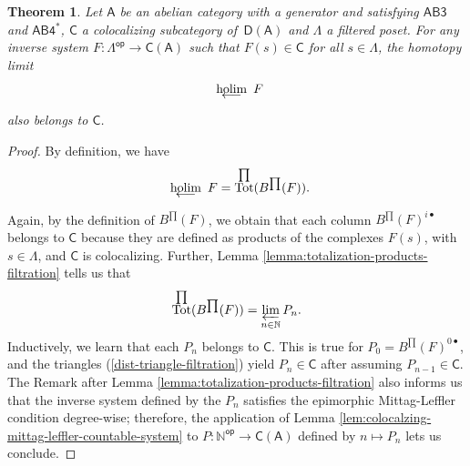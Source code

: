 \documentclass[reqno,11pt]{amsart}
\theoremstyle{plain}
\newtheorem{thm}{Theorem}[section]
\theoremstyle{remark}
\theoremstyle{definition}
\numberwithin{equation}{thm}
\newcommand{\SA}{\mathsf{A}}
\newcommand{\SC}{\mathsf{C}}
\newcommand{\CCC}{\boldsymbol{\mathsf{C}}}
\newcommand{\D}{\boldsymbol{\mathsf{D}}}
\newcommand{\NN}{\mathbb{N}}
\newcommand{\holim}[1]{\begin{array}[t]{c} {\rm holim}\\[-7.5 pt]
		{\longleftarrow} \end{array}}
\DeclareMathOperator{\Tot}{Tot}
\newcommand{\op}{\mathsf{op}}
\begin{document}
	\begin{thm}\label{thm:holim-colocalizing}
		Let $\SA$ be an abelian category with a generator and satisfying $\mathsf{AB3}$ and $\mathsf{AB4^*}$, $\SC$ a colocalizing subcategory of \,$\D(\SA)$ and $\Lambda$ a filtered poset. For any inverse system $F \colon \Lambda^\op \to \CCC(\SA)$ such that $F(s) \in \SC$ for all $s \in \Lambda$, the homotopy limit
		\[
		\holim{} F
		\]
		also belongs to $\SC$.
	\end{thm}
	\begin{proof}
		By definition, we have 
		\[
			\holim{} F = \Tot^{\prod}(B^{\prod}(F)).
		\]
		Again, by the definition of $B^{\prod}(F)$, we obtain that each column $B^{\prod}(F)^{i \bullet}$ belongs to $\SC$ because they are defined as products of the complexes $F(s)$, with $s \in \Lambda$, and $\SC$ is colocalizing. Further, Lemma \ref{lemma:totalization-products-filtration} tells us that 
		\[
			\Tot^{\prod}(B^{\prod}(F)) = \varprojlim_{n \in \NN} P_n.
		\]
		Inductively, we learn that each $P_n$ belongs to $\SC$. This is true for $P_0 = B^{\prod}(F)^{0 \bullet}$, and the triangles (\ref{dist-triangle-filtration}) yield $P_n \in \SC$ after assuming $P_{n-1} \in \SC$. The Remark after Lemma \ref{lemma:totalization-products-filtration} also informs us that the inverse system defined by the $P_n$ satisfies the epimorphic Mittag-Leffler condition degree-wise; therefore, the application of Lemma \ref{lem:colocalzing-mittag-leffler-countable-system} to $P \colon \NN^\op \to \CCC(\SA)$ defined by $n \mapsto P_n$ lets us conclude. 
	\end{proof}
	
\end{document}
